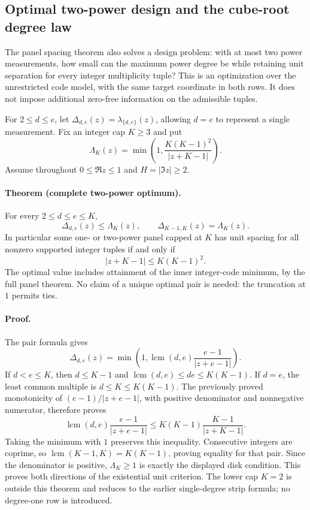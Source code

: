\subsection{Optimal two-power design and the cube-root degree law}
\label{sec:two-power-degree-budget}

The panel spacing theorem also solves a design problem: with at most two
power measurements, how small can the maximum power degree be while retaining
unit separation for every integer multiplicity tuple? This is an optimization
over the unrestricted code model, with the same target coordinate in both rows.
It does not impose additional zero-free information on the admissible tuples.

For \(2\le d\le e\), let
\(\Delta_{d,e}(z)=\lambda_{\{d,e\}}(z)\), allowing \(d=e\) to represent a
single measurement. Fix an integer cap \(K\ge3\) and put
\[
 \Lambda_K(z)=\min\left(1,
    \frac{K(K-1)^2}{|z+K-1|}\right).
\]
Assume throughout \(0\le\Re z\le1\) and \(H=|\Im z|\ge2\).

\paragraph{Theorem (complete two-power optimum).}
For every \(2\le d\le e\le K\),
\[
 \Delta_{d,e}(z)\le\Lambda_K(z),\qquad
 \Delta_{K-1,K}(z)=\Lambda_K(z).
\]
In particular some one- or two-power panel capped at \(K\) has unit spacing
for all nonzero supported integer tuples if and only if
\[
 |z+K-1|\le K(K-1)^2.
\]
The optimal value includes attainment of the inner integer-code minimum,
by the full panel theorem. No claim of a unique optimal pair is needed:
the truncation at \(1\) permits ties.

\paragraph{Proof.}
The pair formula gives
\[
 \Delta_{d,e}(z)=\min\left(1,
   \operatorname{lcm}(d,e)\frac{e-1}{|z+e-1|}\right).
\]
If \(d<e\le K\), then \(d\le K-1\) and
\(\operatorname{lcm}(d,e)\le de\le K(K-1)\).
If \(d=e\), the least common multiple is \(d\le K\le K(K-1)\).
The previously proved monotonicity of
\((e-1)/|z+e-1|\), with positive denominator and nonnegative numerator,
therefore proves
\[
 \operatorname{lcm}(d,e)\frac{e-1}{|z+e-1|}
 \le K(K-1)\frac{K-1}{|z+K-1|}.
\]
Taking the minimum with \(1\) preserves this inequality.
Consecutive integers are coprime, so
\(\operatorname{lcm}(K-1,K)=K(K-1)\), proving equality for that pair.
Since the denominator is positive, \(\Lambda_K\ge1\) is exactly the displayed
disk condition. This proves both directions of the existential unit criterion.
The lower cap \(K=2\) is outside this theorem and reduces to the earlier
single-degree strip formula; no degree-one row is introduced.

